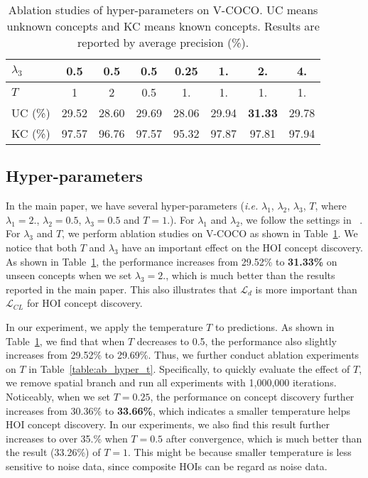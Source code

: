 \documentclass[runningheads]{llncs}
\newcommand{\ie}{\textit{i.e. }}
\begin{document}
\begin{table}[tp]
\setlength\tabcolsep{4pt}
\small
\caption{Ablation studies of hyper-parameters on V-COCO. UC means unknown concepts and KC means known concepts. Results are reported by average precision (\%).}
\label{table:ab_hyper}
\centering

\begin{tabular}{@{}l|c|cccccc@{}}
\hline 
$\lambda_3$ & 0.5 & 0.5 & 0.5 & 0.25 & 1. & 2. & 4.\\
\hline
$T$ & 1 & 2 & 0.5 & 1. & 1. & 1. & 1.\\
\hline
UC (\%) & 29.52 & 28.60 & 29.69 & 28.06 & 29.94 & {\bf 31.33} & 29.78\\
KC (\%) & 97.57 & 96.76 & 97.57 & 95.32 & 97.87 & 97.81 & 97.94\\

\hline 
\end{tabular}

\end{table}



\subsection{Hyper-parameters}

In the main paper, we have several hyper-parameters (\ie $\lambda_1$, $\lambda_2$, $\lambda_3$, $T$, where $\lambda_1=2.$, $\lambda_2=0.5$, $\lambda_3=0.5$ and $T=1.$). For $\lambda_1$ and $\lambda_2$, we follow the settings in ~\cite{hou2020visual}. For $\lambda_3$ and $T$, we perform ablation studies on V-COCO as shown in Table~\ref{table:ab_hyper}. We notice that both $T$ and $\lambda_3$ have an important effect on the HOI concept discovery. As shown in Table~\ref{table:ab_hyper}, the performance increases from 29.52\% to {\bf 31.33\%} on unseen concepts when we set $\lambda_3 = 2.$, which is much better than the results reported in the main paper. This also illustrates that $\mathcal{L}_d$ is more important than $\mathcal{L}_{CL}$ for HOI concept discovery.

In our experiment, we apply the temperature $T$ to predictions. As shown in Table~\ref{table:ab_hyper}, we find that when $T$ decreases to 0.5, the performance also slightly increases from 29.52\% to 29.69\%. Thus, we further conduct ablation experiments on $T$ in Table~\ref{table:ab_hyper_t}. Specifically, to quickly evaluate the effect of $T$, we remove spatial branch and run all experiments with 1,000,000 iterations. Noticeably, when we set $T=0.25$, the performance on concept discovery further increases from 30.36\% to {\bf 33.66\%}, which indicates a smaller temperature helps HOI concept discovery. In our experiments, we also find this result further increases to over 35.\% when $T=0.5$ after convergence, which is much better than the result (33.26\%) of $T=1$. This might be because smaller temperature is less sensitive to noise data, since composite HOIs can be regard as noise data. 
\end{document}
